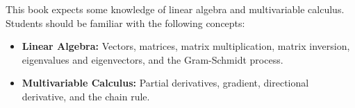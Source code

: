 \documentclass[../main/main]{subfiles}
\begin{document}
    

This book expects some knowledge of linear algebra and multivariable calculus. Students should be familiar with the following concepts:

\begin{itemize}
    \item \textbf{Linear Algebra:} Vectors, matrices, matrix multiplication, matrix inversion, eigenvalues and eigenvectors, and the Gram-Schmidt process.
    \item \textbf{Multivariable Calculus:} Partial derivatives, gradient, directional derivative, and the chain rule.
\end{itemize}
\end{document}
